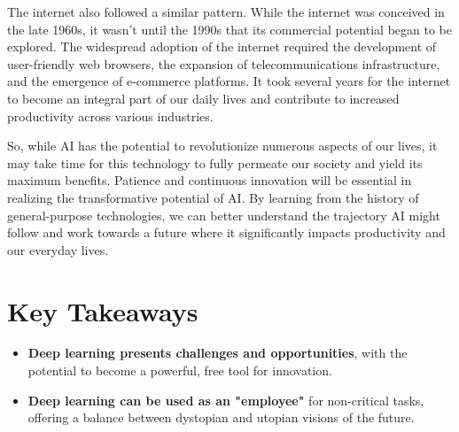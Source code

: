 The internet also followed a similar pattern. While the internet was conceived in the late 1960s, it wasn't until the 1990s that its commercial potential began to be explored. The widespread adoption of the internet required the development of user-friendly web browsers, the expansion of telecommunications infrastructure, and the emergence of e-commerce platforms. It took several years for the internet to become an integral part of our daily lives and contribute to increased productivity across various industries.

So, while AI has the potential to revolutionize numerous aspects of our lives, it may take time for this technology to fully permeate our society and yield its maximum benefits. Patience and continuous innovation will be essential in realizing the transformative potential of AI. By learning from the history of general-purpose technologies, we can better understand the trajectory AI might follow and work towards a future where it significantly impacts productivity and our everyday lives.

\section{Key Takeaways}

\begin{itemize}
    \item \textbf{Deep learning presents challenges and opportunities}, with the potential to become a powerful, free tool for innovation.
    \item \textbf{Deep learning can be used as an "employee"} for non-critical tasks, offering a balance between dystopian and utopian visions of the future.
\end{itemize}
